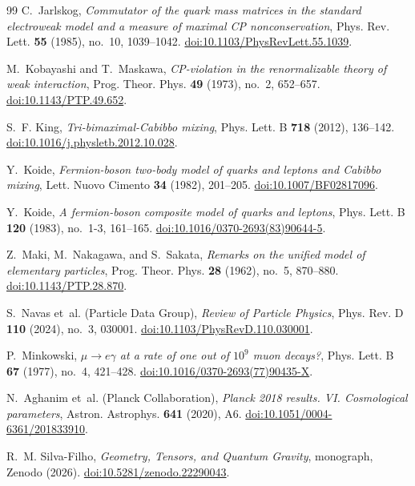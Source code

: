 \documentclass[11pt,reqno]{amsart}
\theoremstyle{definition}
\begin{document}
\begin{thebibliography}{99}
C.~Jarlskog,
\emph{Commutator of the quark mass matrices in the standard electroweak model and a measure of maximal CP nonconservation},
Phys. Rev. Lett. \textbf{55} (1985), no.~10, 1039--1042.
\href{https://doi.org/10.1103/PhysRevLett.55.1039}{doi:10.1103/PhysRevLett.55.1039}.

M.~Kobayashi and T.~Maskawa,
\emph{CP-violation in the renormalizable theory of weak interaction},
Prog. Theor. Phys. \textbf{49} (1973), no.~2, 652--657.
\href{https://doi.org/10.1143/PTP.49.652}{doi:10.1143/PTP.49.652}.

S.~F. King,
\emph{Tri-bimaximal-Cabibbo mixing},
Phys. Lett. B \textbf{718} (2012), 136--142.
\href{https://doi.org/10.1016/j.physletb.2012.10.028}{doi:10.1016/j.physletb.2012.10.028}.

Y.~Koide,
\emph{Fermion-boson two-body model of quarks and leptons and Cabibbo mixing},
Lett. Nuovo Cimento \textbf{34} (1982), 201--205.
\href{https://doi.org/10.1007/BF02817096}{doi:10.1007/BF02817096}.

Y.~Koide,
\emph{A fermion-boson composite model of quarks and leptons},
Phys. Lett. B \textbf{120} (1983), no.~1-3, 161--165.
\href{https://doi.org/10.1016/0370-2693(83)90644-5}{doi:10.1016/0370-2693(83)90644-5}.

Z.~Maki, M.~Nakagawa, and S.~Sakata,
\emph{Remarks on the unified model of elementary particles},
Prog. Theor. Phys. \textbf{28} (1962), no.~5, 870--880.
\href{https://doi.org/10.1143/PTP.28.870}{doi:10.1143/PTP.28.870}.

S.~Navas et~al. (Particle Data Group),
\emph{Review of Particle Physics},
Phys. Rev. D \textbf{110} (2024), no.~3, 030001.
\href{https://doi.org/10.1103/PhysRevD.110.030001}{doi:10.1103/PhysRevD.110.030001}.

P.~Minkowski,
\emph{$\mu \to e\gamma$ at a rate of one out of $10^9$ muon decays?},
Phys. Lett. B \textbf{67} (1977), no.~4, 421--428.
\href{https://doi.org/10.1016/0370-2693(77)90435-X}{doi:10.1016/0370-2693(77)90435-X}.

N.~Aghanim et~al. (Planck Collaboration),
\emph{Planck 2018 results. VI. Cosmological parameters},
Astron. Astrophys. \textbf{641} (2020), A6.
\href{https://doi.org/10.1051/0004-6361/201833910}{doi:10.1051/0004-6361/201833910}.

R.~M. Silva-Filho,
\emph{Geometry, Tensors, and Quantum Gravity},
monograph, Zenodo (2026).
\href{https://doi.org/10.5281/zenodo.22290043}{doi:10.5281/zenodo.22290043}.


\end{thebibliography}
\end{document}
